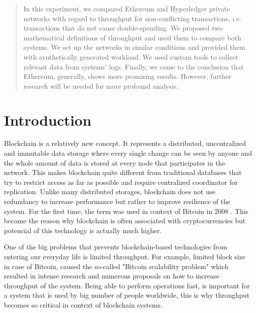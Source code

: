 \documentclass[12pt]{article}
\begin{document}

\tableofcontents
\pagebreak


\begin{abstract}
In this experiment, we compared Ethereum and Hyperledger private networks with regard to throughput for non-conflicting transactions, i.e. transactions that do not cause double-spending. We proposed two mathematical definitions of throughput and used them to compare both systems. We set up the networks in similar conditions and provided them with synthetically generated workload. We used custom tools to collect relevant data from systems’ logs. Finally, we came to the conclusion that Ethereum, generally, shows more promising results. However, further research will be needed for more profound analysis.
\end{abstract}

\newpage
\section{Introduction}

Blockchain is a relatively new concept. It represents a distributed, uncentralized and immutable data storage where every single change can be seen by anyone and the whole amount of data is stored at every node that participates in the network. This makes blockchain quite different from traditional databases that try to restrict access as far as possible and require centralized coordinator for replication. Unlike many distributed storages, blockchain does not use redundancy to increase performance but rather to improve resilience of the system. For the first time, the term was used in context of Bitcoin in 2008 \cite{bitcoin}. This became the reason why blockchain is often associated with cryptocurrencies but potencial of this technology is actually much higher.

One of the big problems that prevents blockchain-based technologies from entering our everyday life is limited throughput. For example, limited block size in case of Bitcoin, caused the so-called "Bitcoin scalability problem" which resulted in intense research \cite{bitcoin_scaling} and numerous proposals on how to increase throughput of the system. Being able to perform operations fast, is important for a system that is used by big number of people worldwide, this is why throughput becomes so critical in context of blockchain systems.
\end{document}
